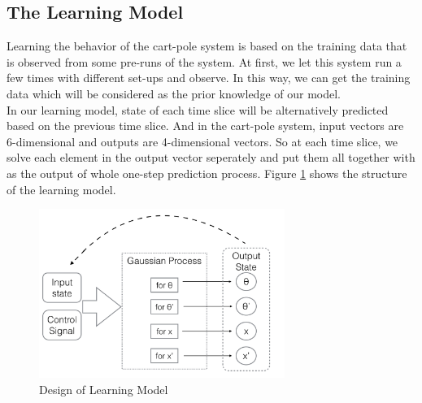\documentclass[11pt,twoside,a4paper]{article}
\begin{document}
\subsection{The Learning Model}
Learning the behavior of the cart-pole system is based on the
training data that is observed from some pre-runs of the system. At
first, we let this system run a few times with different
set-ups and observe. In this way, we can get the training data which
will be considered as the prior knowledge of our model.\\ 

In our learning model, state of each time slice will be alternatively
predicted based on the previous time slice. And in the cart-pole
system, input vectors are 6-dimensional and outputs are 4-dimensional
vectors. So at each time slice, we solve each element in
the output vector seperately and put them all together with as the
output of whole one-step prediction process. Figure
\ref{learning-model} shows the structure of the learning model.\\

\begin{figure}[h!]
\begin{center}
\includegraphics[width=8cm]{learning-model.png}
\caption{Design of Learning Model}
\label{learning-model}
\end{center}
\end{figure}
\end{document}
